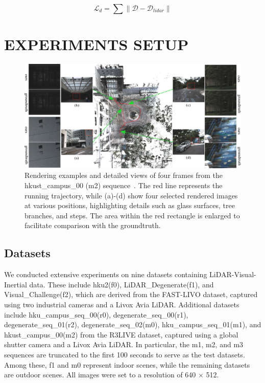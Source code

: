 \documentclass[lettersize,journal]{IEEEtran}
\begin{document}
\begin{equation}
\mathcal{L}_d = \sum \left\lVert \mathcal{D} - \mathcal{D}_{lidar} \right\rVert
\label{eq:mathcalLd}
\end{equation}


\section{EXPERIMENTS SETUP}

\begin{figure}[ht]  %
        \captionsetup{justification=justified, labelsep=colon}%
        \centering
        \includegraphics[width=2.0\columnwidth]{image/fullseq/fullseq.pdf}
        \caption{Rendering examples and detailed views of four frames from the hkust_campus_00 (m2) sequence~\cite{r3live}. The red line represents the running trajectory, while (a)-(d) show four selected rendered images at various positions, highlighting details such as glass surfaces, tree branches, and steps. The area within the red rectangle is enlarged to facilitate comparison with the groundtruth.}
        \label{fig:fullseq}
\end{figure}%


\subsection{Datasets}
We conducted extensive experiments on nine datasets containing LiDAR-Visual-Inertial data. These include hku2(f0), LiDAR_Degenerate(f1), and Visual_Challenge(f2), which are derived from the FAST-LIVO\cite{fastlivo} dataset, captured using two industrial cameras and a Livox Avia LiDAR. Additional datasets include hku_campus_seq_00(r0), degenerate_seq_00(r1), degenerate_seq_01(r2), degenerate_seq_02(m0), hku_campus_seq_01(m1), and hkust_campus_00(m2) from the R3LIVE\cite{r3live} dataset, captured using a global shutter camera and a Livox Avia LiDAR. In particular, the m1, m2, and m3 sequences are truncated to the first 100 seconds to serve as the test datasets. Among these, f1 and m0 represent indoor scenes, while the remaining datasets are outdoor scenes. All images were set to a resolution of 640 × 512.
\end{document}
